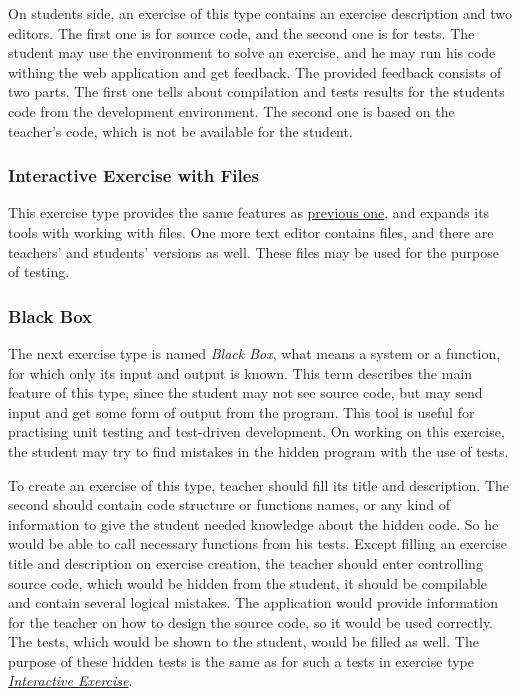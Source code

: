             On students side, an exercise of this type contains an exercise description and two editors. The first one is for source code, and the second one is for tests. The student may use the environment to solve an exercise, and he may run his code withing the web application and get feedback. The provided feedback consists of two parts. The first one tells about compilation and tests results for the students code from the development environment. The second one is based on the teacher's code, which is not be available for the student.
            
            
            \subsubsection{Interactive Exercise with Files}
            This exercise type provides the same features as \hyperref[subsubsec:whitebox]{previous one}, and expands its tools with working with files. One more text editor contains files, and there are teachers' and students' versions as well. These files may be used for the purpose of testing.
            
            
            \subsubsection{Black Box}
            \label{subsubsec:blackbox}
            The next exercise type is named \textit{Black Box}, what means a system or a function, for which only its input and output is known. This term describes the main feature of this type, since the student may not see source code, but may send input and get some form of output from the program. This tool is useful for practising unit testing and test-driven development. On working on this exercise, the student may try to find mistakes in the hidden program with the use of tests.
            
            To create an exercise of this type, teacher should fill its title and description. The second should contain code structure or functions names, or any kind of information to give the student needed knowledge about the hidden code. So he would be able to call necessary functions from his tests. Except filling an exercise title and description on exercise creation, the teacher should enter controlling source code, which would be hidden from the student, it should be compilable and contain several logical mistakes. The application would provide information for the teacher on how to design the source code, so it would be used correctly. The tests, which would be shown to the student, would be filled as well. The purpose of these hidden tests is the same as for such a tests in exercise type \hyperref[subsubsec:whitebox]{\textit{Interactive Exercise}}.
            
